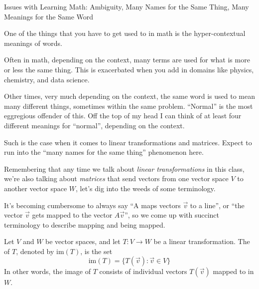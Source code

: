 \documentclass{ximera}
\begin{document}
\begin{remark}{Issues with Learning Math: Ambiguity, Many Names for the Same Thing, Many Meanings for the Same Word}

  One of the things that you have to get used to in math is the hyper-contextual meanings of words. 

  Often in math, depending on the context, many terms are used for what is more or less the same thing. This is exacerbated when you add in domains like physics, chemistry, and data science. 

  Other times, very much depending on the context, the same word is used to mean many different things, sometimes within the same problem. ``Normal'' is the most eggregious offender of this. Off the top of my head I can think of at least four different meanings for ``normal'', depending on the context.

  Such is the case when it comes to linear transformations and matrices. Expect to run into the ``many names for the same thing'' phenomenon here. 

\end{remark}



Remembering that any time we talk about \emph{linear transformations} in this class, we're also talking about \emph{matrices} that send vectors from one vector space $V$ to another vector space $W$, let's dig into the weeds of some terminology.

It's becoming cumbersome to always say ``A maps vectors $\vec{v}$ to a line'', or ``the vector $\vec{v}$ gets mapped to the vector $A\vec{v}$'', so we come up with succinct terminology to describe mapping and being mapped. 

\begin{definition}\label{def:imageofT}
Let $V$ and $W$ be vector spaces, and let $T:V\rightarrow W$ be a linear transformation.  The  of $T$, denoted by $\mbox{im}(T)$, is the set
$$\mbox{im}(T)=\{T(\vec{v}):\vec{v}\in V\}$$
In other words, the image of $T$ consists of individual vectors $T(\vec{v})$ mapped to in $W$.
\end{definition}
 
\end{document}
